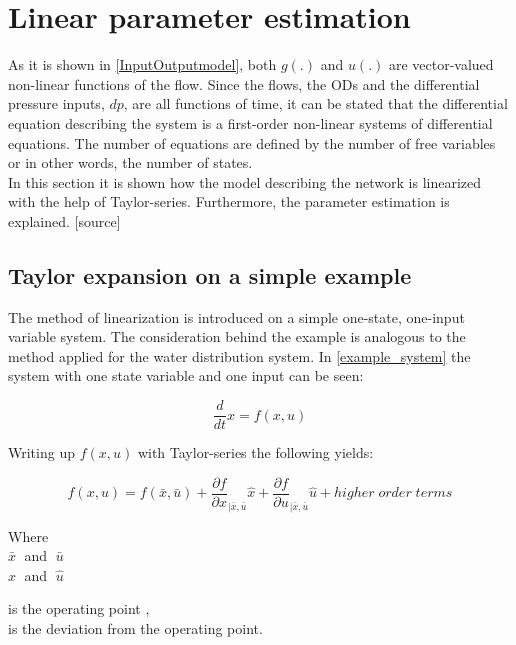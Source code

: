 \section{Linear parameter estimation} 
\label{LinParamEst}

As it is shown in \eqref{InputOutputmodel}, both $g(.)$ and $u(.)$ are vector-valued non-linear functions of the flow. Since the flows, the ODs and the differential pressure inputs, $dp$, are all functions of time, it can be stated that the differential equation describing the system is a first-order non-linear systems of differential equations. The number of equations are defined by the number of free variables or in other words, the number of states.
\\
In this section it is shown how the model describing the network is linearized with the help of Taylor-series. Furthermore, the parameter estimation is explained. [source] 

\subsection{Taylor expansion on a simple example}
 \label{Taylorexamplesection}

The method of linearization is introduced on a simple one-state, one-input variable system. The consideration behind the example is analogous to the method applied for the water distribution system. In \eqref{example_system} the system with one state variable and one input can be seen: 

\begin{equation}
\frac{d}{dt} x = f(x,u)
 \label{example_system}
\end{equation}

Writing up $f(x,u)$ with Taylor-series the following yields: 

\begin{equation}
f(x,u) = f(\bar{x},\bar{u}) + \frac{\partial f}{\partial x}_{|\bar{x}, \bar{u}} \hat{x} + \frac{\partial f}{\partial u}_{|\bar{x}, \bar{u}} \hat{u} + higher \; order \; terms  
 \label{TaylorExpansion}
\end{equation}

\begin{minipage}[t]{0.20\textwidth}
Where\\
\hspace*{8mm} $\bar{x} \;$ and $\; \bar{u}$ \\
\hspace*{8mm} $\hat{x} \;$ and $\; \hat{u}$ 
\end{minipage}
\begin{minipage}[t]{0.68\textwidth}
\vspace*{2mm}
is the operating point ,\\
is the deviation from the operating point.
\end{minipage}

